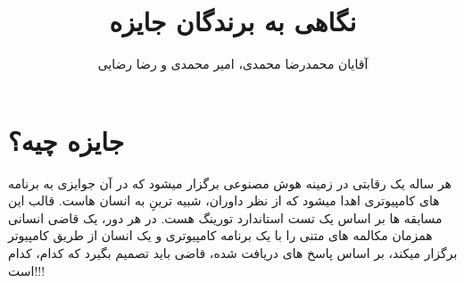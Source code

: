 \documentclass[14pt,a4paper]{report}
\title{نگاهی به برندگان جایزه  \lr{Loebner}}
\author{ آقایان محمدرضا محمدی، امیر محمدی و رضا رضایی}
\begin{document}
	
 	\maketitle
 	\tableofcontents
 	
 	
 	\chapter{جایزه  چیه؟} 
 	هر ساله یک رقابتی در زمینه هوش مصنوعی برگزار میشود که در آن جوایزی به برنامه های کامپیوتری اهدا میشود که از نظر داوران،  شبیه ترینِ به انسان هاست. قالب این مسابقه ها بر اساس یک تست استاندارد تورینگ هست. در هر دور، یک قاضی انسانی همزمان مکالمه های متنی را با یک برنامه کامپیوتری و یک انسان از طریق کامپیوتر برگزار میکند، بر اساس پاسخ های دریافت شده، قاضی باید تصمیم بگیرد که کدام، کدام است!!!
 	
 	
 	
\end{document}

